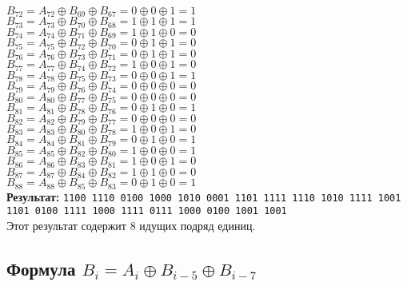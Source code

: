 $B_{72}=A_{72}\oplus B_{69}\oplus B_{67}=0\oplus 0\oplus 1=1$\\
$B_{73}=A_{73}\oplus B_{70}\oplus B_{68}=1\oplus 1\oplus 1=1$\\
$B_{74}=A_{74}\oplus B_{71}\oplus B_{69}=1\oplus 1\oplus 0=0$\\
$B_{75}=A_{75}\oplus B_{72}\oplus B_{70}=0\oplus 1\oplus 1=0$\\
$B_{76}=A_{76}\oplus B_{73}\oplus B_{71}=0\oplus 1\oplus 1=0$\\
$B_{77}=A_{77}\oplus B_{74}\oplus B_{72}=1\oplus 0\oplus 1=0$\\
$B_{78}=A_{78}\oplus B_{75}\oplus B_{73}=0\oplus 0\oplus 1=1$\\
$B_{79}=A_{79}\oplus B_{76}\oplus B_{74}=0\oplus 0\oplus 0=0$\\
$B_{80}=A_{80}\oplus B_{77}\oplus B_{75}=0\oplus 0\oplus 0=0$\\
$B_{81}=A_{81}\oplus B_{78}\oplus B_{76}=0\oplus 1\oplus 0=1$\\
$B_{82}=A_{82}\oplus B_{79}\oplus B_{77}=0\oplus 0\oplus 0=0$\\
$B_{83}=A_{83}\oplus B_{80}\oplus B_{78}=1\oplus 0\oplus 1=0$\\
$B_{84}=A_{84}\oplus B_{81}\oplus B_{79}=0\oplus 1\oplus 0=1$\\
$B_{85}=A_{85}\oplus B_{82}\oplus B_{80}=1\oplus 0\oplus 0=1$\\
$B_{86}=A_{86}\oplus B_{83}\oplus B_{81}=1\oplus 0\oplus 1=0$\\
$B_{87}=A_{87}\oplus B_{84}\oplus B_{82}=1\oplus 1\oplus 0=0$\\
$B_{88}=A_{88}\oplus B_{85}\oplus B_{83}=0\oplus 1\oplus 0=1$\\

\textbf{Результат:} \texttt{1100 1110 0100 1000 1010 0001 1101 1111 1110 1010 1111 1001 1101 0100 1111 1000 1111 0111 1000 0100 1001 1001}\\
Этот результат содержит 8 идущих подряд единиц.


\subsection{Формула $B_i=A_i\oplus B_{i-5}\oplus B_{i-7}$}

